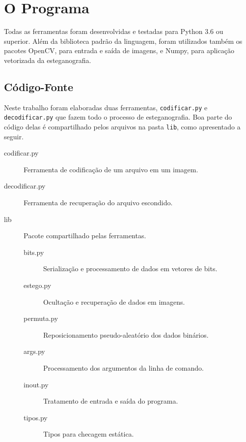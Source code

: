 \section{O Programa} \label{sec:programa}

Todas as ferramentas foram desenvolvidas e testadas para Python 3.6 ou superior. Além da biblioteca padrão da linguagem, foram utilizados também os pacotes OpenCV, para entrada e saída de imagens, e Numpy, para aplicação vetorizada da esteganografia.

\subsection{Código-Fonte}

    Neste trabalho foram elaboradas duas ferramentas, \texttt{codificar.py} e \texttt{decodificar.py} que fazem todo o processo de esteganografia. Boa parte do código delas é compartilhado pelos arquivos na pasta \texttt{lib}, como apresentado a seguir.

    \begin{description}
        \item[codificar.py] Ferramenta de codificação de um arquivo em um imagem.

        \item[decodificar.py] Ferramenta de recuperação do arquivo escondido.

        \item[lib] Pacote compartilhado pelas ferramentas.

        \begin{description}
            \item[bits.py] Serialização e processamento de dados em vetores de bits.

            \item[estego.py] Ocultação e recuperação de dados em imagens.

            \item[permuta.py] Reposicionamento pseudo-aleatório dos dados binários.

            \item[args.py] Processamento dos argumentos da linha de comando.

            \item[inout.py] Tratamento de entrada e saída do programa.

            \item[tipos.py] Tipos para checagem estática.
        \end{description}
    \end{description}

